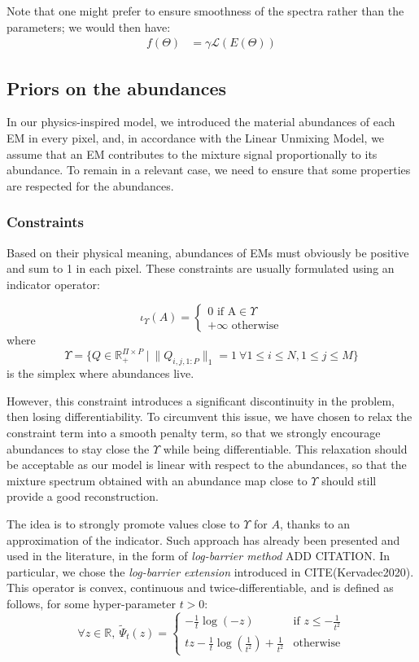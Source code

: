 \documentclass{article}
\begin{document}
Note that one might prefer to ensure smoothness of the spectra rather than the parameters; we would then have:
\begin{align*}
  f(\Theta) &= \gamma \mathcal{L}(E(\Theta))
\end{align*}

\subsection{Priors on the abundances}
In our physics-inspired model, we introduced the material abundances of each EM in every pixel, and, in accordance with the Linear Unmixing Model, we assume that an EM contributes to the mixture signal proportionally to its abundance. To remain in a relevant case, we need to ensure that some properties are respected for the abundances.

\subsubsection{Constraints}

Based on their physical meaning, abundances of EMs must obviously be positive and sum to 1 in each pixel. These constraints are usually formulated using an indicator operator:

$$\iota_\Upsilon (A) = \begin{cases} 0 \text{ if A}\in \Upsilon\\ +\infty \text{ otherwise} \end{cases}$$
where
$$\Upsilon = \{Q \in \mathbb{R}^{\Pi \times P}_+\ |\ \| Q_{i, j, 1:P} \|_1 = 1 \ \forall 1 \leq i \leq N, 1 \leq j \leq M\}$$
is the simplex where abundances live.

However, this constraint introduces a significant discontinuity in the problem, then losing differentiability. To circumvent this issue, we have chosen to relax the constraint term into a smooth penalty term, so that we strongly encourage abundances to stay close the $\Upsilon$ while being differentiable. This relaxation should be acceptable as our model is linear with respect to the abundances, so that the mixture spectrum obtained with an abundance map close to $\Upsilon$ should still provide a good reconstruction.

The idea is to strongly promote values close to $\Upsilon$ for $A$, thanks to an approximation of the indicator. Such approach has already been presented and used in the literature, in the form of \emph{log-barrier method} ADD CITATION. In particular, we chose the \emph{log-barrier extension} introduced in CITE(Kervadec2020). This operator is convex, continuous and twice-differentiable, and is defined as follows, for some hyper-parameter $t > 0$:
$$\forall z\in \mathbb{R},\ \tilde\Psi_t (z) = \begin{cases} - \frac{1}{t} \log (-z) & \text{if } z \leq -\frac{1}{t^2}\\ tz - \frac{1}{t} \log(\frac{1}{t^2}) + \frac{1}{t^2} & \text{otherwise} \end{cases}$$
\end{document}
